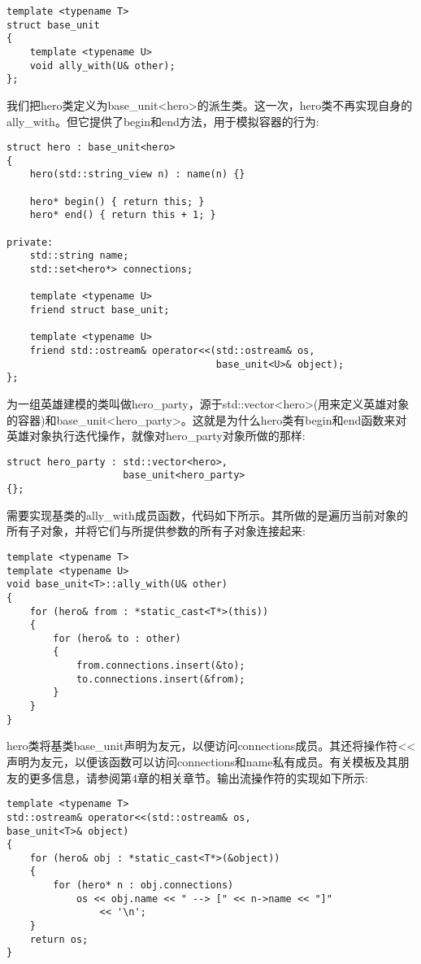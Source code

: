 \begin{lstlisting}[style=styleCXX]
template <typename T>
struct base_unit
{
	template <typename U>
	void ally_with(U& other);
};
\end{lstlisting}

我们把hero类定义为base\_unit<hero>的派生类。这一次，hero类不再实现自身的ally\_with。但它提供了begin和end方法，用于模拟容器的行为:

\begin{lstlisting}[style=styleCXX]
struct hero : base_unit<hero>
{
	hero(std::string_view n) : name(n) {}

	hero* begin() { return this; }
	hero* end() { return this + 1; }

private:
	std::string name;
	std::set<hero*> connections;

	template <typename U>
	friend struct base_unit;

	template <typename U>
	friend std::ostream& operator<<(std::ostream& os,
									base_unit<U>& object);
};
\end{lstlisting}

为一组英雄建模的类叫做hero\_party，源于std::vector<hero>(用来定义英雄对象的容器)和base\_unit<hero\_party>。这就是为什么hero类有begin和end函数来对英雄对象执行迭代操作，就像对hero\_party对象所做的那样:

\begin{lstlisting}[style=styleCXX]
struct hero_party : std::vector<hero>,
					base_unit<hero_party>
{};
\end{lstlisting}

需要实现基类的ally\_with成员函数，代码如下所示。其所做的是遍历当前对象的所有子对象，并将它们与所提供参数的所有子对象连接起来:

\begin{lstlisting}[style=styleCXX]
template <typename T>
template <typename U>
void base_unit<T>::ally_with(U& other)
{
	for (hero& from : *static_cast<T*>(this))
	{
		for (hero& to : other)
		{
			from.connections.insert(&to);
			to.connections.insert(&from);
		}
	}
}
\end{lstlisting}

hero类将基类base\_unit声明为友元，以便访问connections成员。其还将操作符<{}<声明为友元，以便该函数可以访问connections和name私有成员。有关模板及其朋友的更多信息，请参阅第4章的相关章节。输出流操作符的实现如下所示:

\begin{lstlisting}[style=styleCXX]
template <typename T>
std::ostream& operator<<(std::ostream& os,
base_unit<T>& object)
{
	for (hero& obj : *static_cast<T*>(&object))
	{
		for (hero* n : obj.connections)
			os << obj.name << " --> [" << n->name << "]"
				<< '\n';
	}
	return os;
}
\end{lstlisting}

